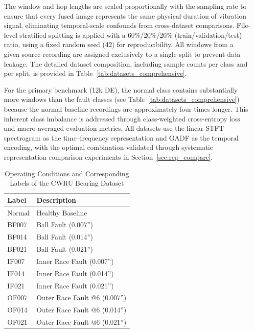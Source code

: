 \documentclass[pdflatex,sn-mathphys-num]{sn-jnl}
\theoremstyle{thmstyleone}%
\theoremstyle{thmstyletwo}%
\theoremstyle{thmstylethree}%
\begin{document}
The window and hop lengths are scaled proportionally with the sampling rate to ensure that every fused image represents the same physical duration of vibration signal, eliminating temporal-scale confounds from cross-dataset comparisons. File-level stratified splitting is applied with a 60\%/20\%/20\% (train/validation/test) ratio, using a fixed random seed (42) for reproducibility. All windows from a given source recording are assigned exclusively to a single split to prevent data leakage. The detailed dataset composition, including sample counts per class and per split, is provided in Table~\ref{tab:datasets_comprehensive}.

For the primary benchmark (12k DE), the normal class contains substantially more windows than the fault classes (see Table~\ref{tab:datasets_comprehensive}) because the normal baseline recordings are approximately four times longer. This inherent class imbalance is addressed through class-weighted cross-entropy loss and macro-averaged evaluation metrics. All datasets use the linear STFT spectrogram as the time--frequency representation and GADF as the temporal encoding, with the optimal combination validated through systematic representation comparison experiments in Section~\ref{sec:rep_compare}.

\begin{table}[!t]
	\caption{Operating Conditions and Corresponding Labels of the CWRU Bearing Dataset\label{tab:operating_conditions}}
	\centering
	\begin{tabular}{ll}
		\toprule
		Label & Description \\
		\midrule
		Normal & Healthy Baseline \\
		BF007 & Ball Fault (0.007'') \\ 
		BF014 & Ball Fault (0.014'') \\
		BF021 & Ball Fault (0.021'') \\
		IF007 & Inner Race Fault (0.007'') \\
		IF014 & Inner Race Fault (0.014'') \\
		IF021 & Inner Race Fault (0.021'') \\
		OF007 & Outer Race Fault @6 (0.007'') \\
		OF014 & Outer Race Fault @6 (0.014'') \\
		OF021 & Outer Race Fault @6 (0.021'') \\
		\bottomrule
	\end{tabular}
\end{table}
\end{document}
